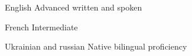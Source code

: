 

\begin{cvhonors}

  \cvhonor
    {English} %
    {Advanced written and spoken} %
    {} %
    {} %

  \cvhonor
    {French}
    {Intermediate}
    {}
    {}

  \cvhonor
    {Ukrainian and russian}
    {Native bilingual proficiency}
    {}
    {}

\end{cvhonors}
